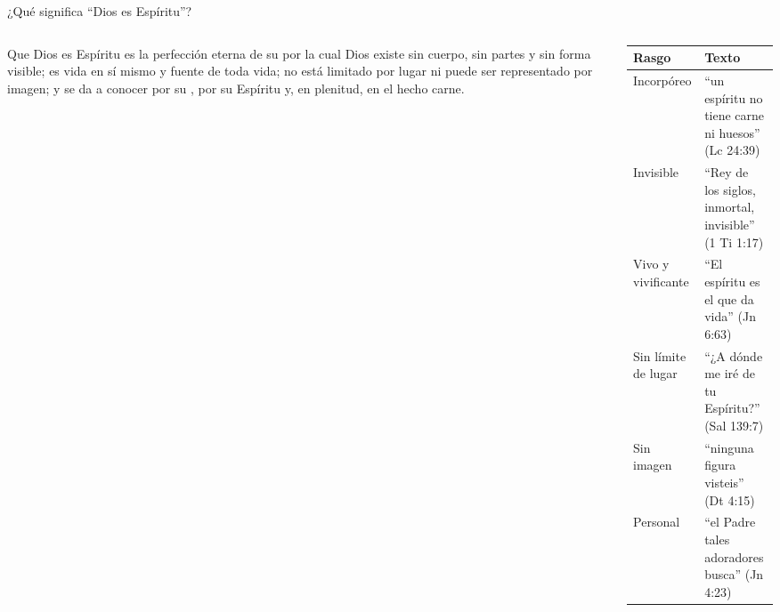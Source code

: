 \begin{frame}{¿Qué significa ``Dios es Espíritu''?}
\begin{columns}[c,onlytextwidth]
\begin{column}{0.48\textwidth}
\begin{tcolorbox}[colback=papiro,colframe=azul,boxrule=1pt,arc=3pt,title={\small Definición},colbacktitle=azul,coltitle=papiro]
\small Que Dios es Espíritu es la perfección eterna de su  por la cual Dios existe sin cuerpo, sin partes y sin forma visible; es vida en sí mismo y fuente de toda vida; no está limitado por lugar ni puede ser representado por imagen; y se da a conocer por su , por su Espíritu y, en plenitud, en el  hecho carne.
\end{tcolorbox}
\end{column}
\begin{column}{0.50\textwidth}
\scriptsize\renewcommand{\arraystretch}{1.15}
\begin{tabular}{@{}>{\RaggedRight\arraybackslash}p{2.0cm}>{\RaggedRight\arraybackslash}p{4.2cm}@{}}
\toprule
\textbf{Rasgo} & \textbf{Texto} \\ \midrule
Incorpóreo & ``un espíritu no tiene carne ni huesos'' (Lc 24:39) \\
Invisible & ``Rey de los siglos, inmortal, invisible'' (1 Ti 1:17) \\
Vivo y vivificante & ``El espíritu es el que da vida'' (Jn 6:63) \\
Sin límite de lugar & ``¿A dónde me iré de tu Espíritu?'' (Sal 139:7) \\
Sin imagen & ``ninguna figura visteis'' (Dt 4:15) \\
Personal & ``el Padre tales adoradores busca'' (Jn 4:23) \\
\bottomrule
\end{tabular}
\end{column}
\end{columns}
\end{frame}

